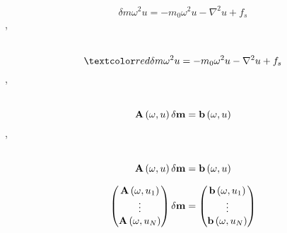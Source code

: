 \begin{frame}
  \[
   {\delta m}\omega^2 { u}= -m_0 \omega^2 { u} -\nabla^2 { u} + { f}_s
  \]
\sep
  \\
   \\
\end{frame}


\begin{frame}
  \[
   \red{\delta m}\omega^2 { u}= -m_0 \omega^2 { u} -\nabla^2 { u} + {f}_s
  \]
\sep
  \\
   \\
\end{frame}



\begin{frame}
  \[
    {\bf A}\left ( {\omega,u} \right){\bf  \delta m}= {\bf b} \left ({\omega,{u}} \right)
  \]
\sep
  \\
   \\
\end{frame}


\begin{frame}
  \[
   {\bf A}\left ( {\omega,u} \right){\bf \delta m}= {\bf b} \left ({\omega,{u}} \right)
  \]
\end{frame}


\begin{frame}
  \[
  \begin{pmatrix}
      {\bf A}\left ( {\omega,{ u}_1} \right)  \\
          \vdots                         \\
      {\bf A}\left ( {\omega,{ u}_N} \right)  \\
  \end{pmatrix} {\delta {\bf m}} =
  \begin{pmatrix}
      {\bf b}\left ( {\omega,{ u}_1} \right)  \\
          \vdots                         \\
      {\bf b}\left ( {\omega,{ u}_N} \right)  \\
  \end{pmatrix} 
  \]
\end{frame}



\begin{frame}
\end{frame}

